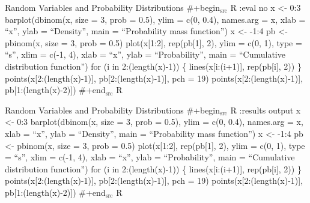 \documentclass[presentation]{beamer}
\begin{document}
\begin{frame}[label={sec:org010cbdf}]{Random Variables and Probability Distributions}
\#+begin\(_{\text{src}}\) R :eval no
x <- 0:3
barplot(dbinom(x, size = 3, prob = 0.5), ylim = c(0, 0.4), names.arg = x, xlab = ``x'',
        ylab = ``Density'', main = ``Probability mass function'')
x <- -1:4
pb <- pbinom(x, size = 3, prob = 0.5)
plot(x[1:2], rep(pb[1], 2), ylim = c(0, 1), type = ``s'', xlim = c(-1, 4), xlab = ``x'',
     ylab = ``Probability'', main = ``Cumulative distribution function'')
for (i in 2:(length(x)-1)) \{
    lines(x[i:(i+1)], rep(pb[i], 2))
\}
points(x[2:(length(x)-1)], pb[2:(length(x)-1)], pch = 19)
points(x[2:(length(x)-1)], pb[1:(length(x)-2)])
\#+end\(_{\text{src}}\) R
\end{frame}




\begin{frame}[label={sec:org75ca69f}]{Random Variables and Probability Distributions}
\#+begin\(_{\text{src}}\) R :results output
x <- 0:3
barplot(dbinom(x, size = 3, prob = 0.5), ylim = c(0, 0.4), names.arg = x, xlab = ``x'',
        ylab = ``Density'', main = ``Probability mass function'')
x <- -1:4
pb <- pbinom(x, size = 3, prob = 0.5)
plot(x[1:2], rep(pb[1], 2), ylim = c(0, 1), type = ``s'', xlim = c(-1, 4), xlab = ``x'',
     ylab = ``Probability'', main = ``Cumulative distribution function'')
for (i in 2:(length(x)-1)) \{
    lines(x[i:(i+1)], rep(pb[i], 2))
\}
points(x[2:(length(x)-1)], pb[2:(length(x)-1)], pch = 19)
points(x[2:(length(x)-1)], pb[1:(length(x)-2)])
\#+end\(_{\text{src}}\) R
\end{frame}
\end{document}

